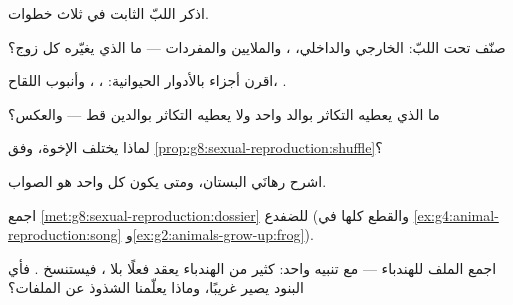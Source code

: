 \begin{exercise}[$\star$]\label{exo:g8:sexual-reproduction:2}
اذكر اللبّ الثابت في ثلاث خطوات.
\end{exercise}

\begin{exercise}[$\star$]\label{exo:g8:sexual-reproduction:3}
صنّف تحت اللبّ:  الخارجي والداخلي،  ،
والملايين والمفردات --- ما الذي يغيّره كل زوج؟
\end{exercise}

\begin{exercise}[$\star$]\label{exo:g8:sexual-reproduction:4}
اقرن أجزاء  بالأدوار الحيوانية: ، ، وأنبوب
اللقاح، .
\end{exercise}

\begin{exercise}[$\star$]\label{exo:g8:sexual-reproduction:5}
ما الذي يعطيه التكاثر بوالد واحد ولا يعطيه التكاثر بوالدين قط ---
والعكس؟
\end{exercise}

\begin{exercise}[$\star$]\label{exo:g8:sexual-reproduction:6}
لماذا يختلف الإخوة، وفق
\cref{prop:g8:sexual-reproduction:shuffle}؟
\end{exercise}

\begin{exercise}[$\star\star$]\label{exo:g8:sexual-reproduction:7}
اشرح رهانَي البستان، ومتى يكون كل واحد هو الصواب.
\end{exercise}

\begin{exercise}[$\star\star$]\label{exo:g8:sexual-reproduction:8}
اجمع \cref{met:g8:sexual-reproduction:dossier} للضفدع (والقطع كلها
في \cref{ex:g4:animal-reproduction:song}
و\cref{ex:g2:animals-grow-up:frog}).
\end{exercise}

\begin{exercise}[$\star\star$]\label{exo:g8:sexual-reproduction:9}
اجمع الملف للهندباء --- مع تنبيه واحد: كثير من الهندباء يعقد
 فعلًا بلا ، فيستنسخ . فأي البنود يصير غريبًا،
وماذا يعلّمنا الشذوذ عن الملفات؟
\end{exercise}

